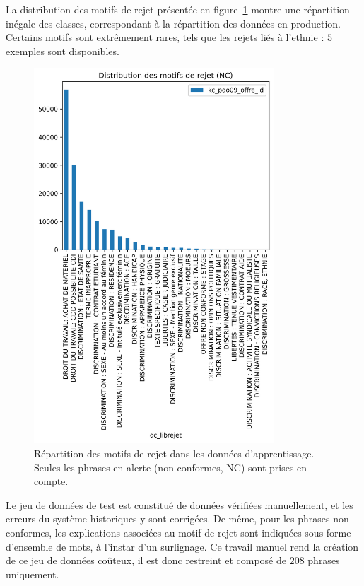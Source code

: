 La distribution des motifs de rejet présentée en figure~\ref{fig:distrib_nc} montre une répartition inégale des classes, correspondant à la répartition des données en production. Certains motifs sont extrêmement rares, tels que les rejets liés à l'ethnie : $5$ exemples sont disponibles.

\begin{figure}[htpb!]
    \centering
    \includegraphics[width=0.8\textwidth]{./S2-Explicabilite_locale/figures/distrib_classes_NC_lego.png}
    \caption{Répartition des motifs de rejet dans les données d'apprentissage. Seules les phrases en alerte (non conformes, NC) sont prises en compte. }
    \label{fig:distrib_nc}
\end{figure}

Le jeu de données de test est constitué de données vérifiées manuellement, et les erreurs du système historiques y sont corrigées. De même, pour les phrases non conformes, les explications associées au motif de rejet sont indiquées sous forme d'ensemble de mots, à l'instar d'un surlignage. Ce travail manuel rend la création de ce jeu de données coûteux, il est donc restreint et composé de $208$ phrases uniquement.

